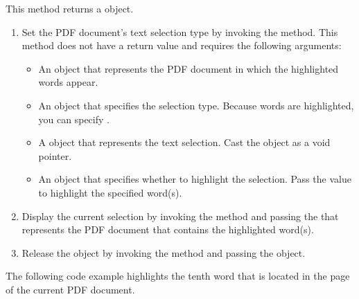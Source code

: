 \documentclass[letterpaper,12pt,english,openany,oneside]{sphinxmanual}
\begin{document}
This method returns a  object.
\begin{enumerate}
%
\item {} 
Set the PDF document’s text selection type by invoking the  method. This method does not have a return value and requires the following arguments:
\begin{itemize}
\item {} 
An  object that represents the PDF document in which the highlighted words appear.

\item {} 
An  object that specifies the selection type. Because words are highlighted, you can specify .

\item {} 
A  object that represents the text selection. Cast the  object as a void pointer.

\item {} 
An  object that specifies whether to highlight the selection. Pass the value  to highlight the specified word(s).

\end{itemize}

\item {} 
Display the current selection by invoking the  method and passing the  that represents the PDF document that contains the highlighted word(s).

\item {} 
Release the  object by invoking the  method and passing the  object.

\end{enumerate}

The following code example highlights the tenth word that is located in the page of the current PDF document.
\end{document}
